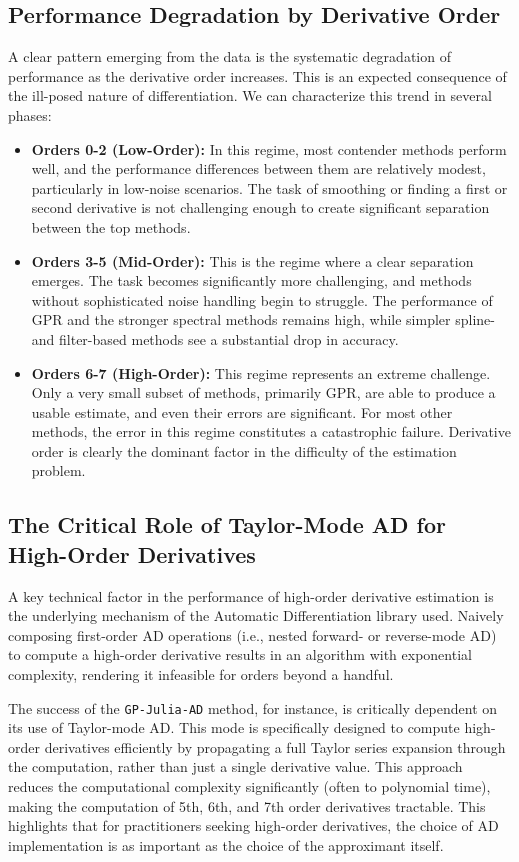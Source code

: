 \subsection{Performance Degradation by Derivative Order}
A clear pattern emerging from the data is the systematic degradation of performance as the derivative order increases. This is an expected consequence of the ill-posed nature of differentiation. We can characterize this trend in several phases:
\begin{itemize}
    \item \textbf{Orders 0-2 (Low-Order):} In this regime, most contender methods perform well, and the performance differences between them are relatively modest, particularly in low-noise scenarios. The task of smoothing or finding a first or second derivative is not challenging enough to create significant separation between the top methods.
    \item \textbf{Orders 3-5 (Mid-Order):} This is the regime where a clear separation emerges. The task becomes significantly more challenging, and methods without sophisticated noise handling begin to struggle. The performance of GPR and the stronger spectral methods remains high, while simpler spline- and filter-based methods see a substantial drop in accuracy.
    \item \textbf{Orders 6-7 (High-Order):} This regime represents an extreme challenge. Only a very small subset of methods, primarily GPR, are able to produce a usable estimate, and even their errors are significant. For most other methods, the error in this regime constitutes a catastrophic failure. Derivative order is clearly the dominant factor in the difficulty of the estimation problem.
\end{itemize}

\subsection{The Critical Role of Taylor-Mode AD for High-Order Derivatives}
A key technical factor in the performance of high-order derivative estimation is the underlying mechanism of the Automatic Differentiation library used. Naively composing first-order AD operations (i.e., nested forward- or reverse-mode AD) to compute a high-order derivative results in an algorithm with exponential complexity, rendering it infeasible for orders beyond a handful.

The success of the \texttt{GP-Julia-AD} method, for instance, is critically dependent on its use of Taylor-mode AD. This mode is specifically designed to compute high-order derivatives efficiently by propagating a full Taylor series expansion through the computation, rather than just a single derivative value. This approach reduces the computational complexity significantly (often to polynomial time), making the computation of 5th, 6th, and 7th order derivatives tractable. This highlights that for practitioners seeking high-order derivatives, the choice of AD implementation is as important as the choice of the approximant itself.

